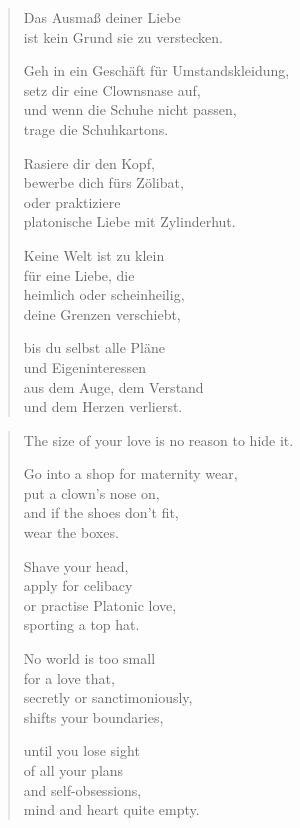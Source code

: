 
\cleartoverso


\begin{verse}

Das Ausmaß deiner Liebe\\
ist kein Grund sie zu verstecken.

Geh in ein Geschäft für Umstandskleidung,\\
setz dir eine Clownsnase auf,\\
und wenn die Schuhe nicht passen,\\
trage die Schuhkartons.

Rasiere dir den Kopf,\\
bewerbe dich fürs Zölibat,\\
oder praktiziere\\
platonische Liebe mit Zylinderhut.

Keine Welt ist zu klein\\
für eine Liebe, die\\
heimlich oder scheinheilig,\\
deine Grenzen verschiebt,

bis du selbst alle Pläne\\
und Eigeninteressen\\
aus dem Auge, dem Verstand\\
und dem Herzen verlierst.
\end{verse}

\clearpage


\begin{verse}

The size of your love is no reason to hide it.

Go into a shop for maternity wear,\\
put a clown's nose on,\\
and if the shoes don't fit,\\
wear the boxes.

Shave your head,\\
apply for celibacy\\
or practise Platonic love,\\
sporting a top hat.

No world is too small\\
for a love that,\\
secretly or sanctimoniously,\\
shifts your boundaries,

until you lose sight\\
of all your plans\\
and self-obsessions,\\
mind and heart quite empty.

\end{verse}

